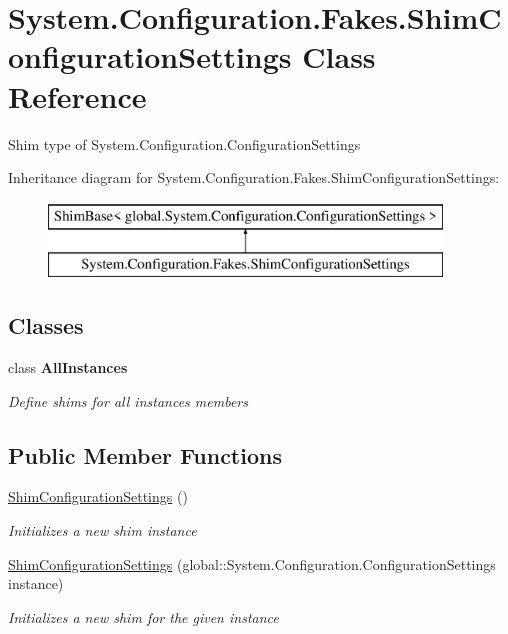 \hypertarget{class_system_1_1_configuration_1_1_fakes_1_1_shim_configuration_settings}{\section{System.\-Configuration.\-Fakes.\-Shim\-Configuration\-Settings Class Reference}
\label{class_system_1_1_configuration_1_1_fakes_1_1_shim_configuration_settings}
}


Shim type of System.\-Configuration.\-Configuration\-Settings 


Inheritance diagram for System.\-Configuration.\-Fakes.\-Shim\-Configuration\-Settings\-:\begin{figure}[H]
\begin{center}
\leavevmode
\includegraphics[height=2.000000cm]{class_system_1_1_configuration_1_1_fakes_1_1_shim_configuration_settings}
\end{center}
\end{figure}
\subsection*{Classes}
\begin{DoxyCompactItemize}
\item 
class {\bfseries All\-Instances}
\begin{DoxyCompactList}\small\item\em Define shims for all instances members\end{DoxyCompactList}\end{DoxyCompactItemize}
\subsection*{Public Member Functions}
\begin{DoxyCompactItemize}
\item 
\hyperlink{class_system_1_1_configuration_1_1_fakes_1_1_shim_configuration_settings_ade12aae15341f38948e3ebcbe14f9b4b}{Shim\-Configuration\-Settings} ()
\begin{DoxyCompactList}\small\item\em Initializes a new shim instance\end{DoxyCompactList}\item 
\hyperlink{class_system_1_1_configuration_1_1_fakes_1_1_shim_configuration_settings_aee582ec8590a167eb05f9266617f11b8}{Shim\-Configuration\-Settings} (global\-::\-System.\-Configuration.\-Configuration\-Settings instance)
\begin{DoxyCompactList}\small\item\em Initializes a new shim for the given instance\end{DoxyCompactList}\end{DoxyCompactItemize}
